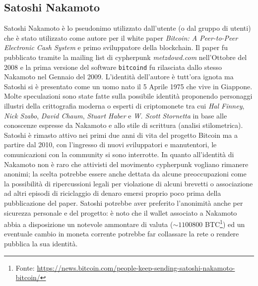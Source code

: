 \appendix
\begin{appendices}
    \chapter{Satoshi Nakamoto}\label{appendix:satoshi}
    Satoshi Nakamoto è lo pseudonimo utilizzato dall'utente (o dal gruppo di utenti) che è stato utilizzato come autore per il white paper \textit{Bitcoin: A Peer-to-Peer Electronic Cash System}\cite{bitcoinwhite} e primo sviluppatore della blockchain.\newline
    Il paper fu pubblicato tramite la mailing list di cypherpunk \textit{metzdowd.com} nell'Ottobre del 2008 e la prima versione del software \texttt{bitcoind} fu rilasciata dallo stesso Nakamoto nel Gennaio del 2009.\newline
    L'identità dell'autore è tutt'ora ignota ma Satoshi si è presentato come un uomo nato il 5 Aprile 1975 che vive in Giappone. Molte speculazioni sono state fatte sulla possibile identità proponendo personaggi illustri della crittografia moderna o esperti di criptomonete tra cui \textit{Hal Finney}, \textit{Nick Szabo}, \textit{David Chaum}, \textit{Stuart Haber} e \textit{W. Scott Stornetta} in base alle conoscenze espresse da Nakamoto e allo stile di scrittura (analisi stilometrica).\newline
    Satoshi è rimasto attivo nei primi due anni di vita del progetto Bitcoin ma a partire dal 2010, con l'ingresso di nuovi sviluppatori e manutentori, le comunicazioni con la community si sono interrotte.\newline
    In quanto all'identità di Nakamoto non è raro che attivisti del movimento cypherpunk vogliano rimanere anonimi; la scelta potrebbe essere anche dettata da alcune preoccupazioni come la possibilità di ripercussioni legali per violazione di alcuni brevetti o associazione ad altri episodi di riciclaggio di denaro emersi proprio poco prima della pubblicazione del paper.\newline
    Satoshi potrebbe aver preferito l'anonimità anche per sicurezza personale e del progetto: è noto che il wallet associato a Nakamoto abbia a disposizione un notevole ammontare di valuta ($\sim1100800$ BTC\footnote{Fonte: \url{https://news.bitcoin.com/people-keep-sending-satoshi-nakamoto-bitcoin/}}) ed un eventuale cambio in moneta corrente potrebbe far collassare la rete o rendere pubblica la sua identità.
\end{appendices}

